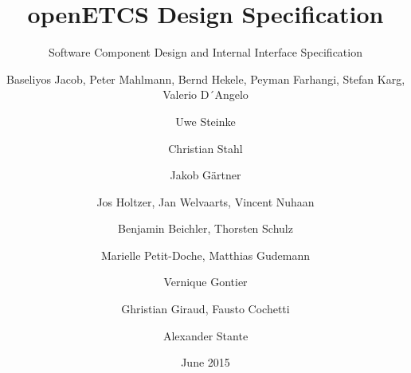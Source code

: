 \documentclass{template/openetcs_report}
\begin{document}
\frontmatter
{}

\newcommand{\define}[1]{\index{#1}\emph{#1}}







\title{openETCS Design Specification}

\subtitle{Software Component Design and Internal Interface Specification}

\date{June 2015}








\author{Baseliyos Jacob, Peter Mahlmann, Bernd Hekele, Peyman Farhangi, Stefan Karg, Valerio D´Angelo}

\author{Uwe Steinke}

\author{Christian Stahl}

\author{Jakob Gärtner}

\author{Jos Holtzer, Jan Welvaarts, Vincent Nuhaan}

\author{Benjamin Beichler, Thorsten Schulz}

\author{Marielle Petit-Doche, Matthias Gudemann}

\author{Vernique Gontier}

\author{Ghristian Giraud, Fausto Cochetti}

\author{Alexander Stante}
\end{document}
